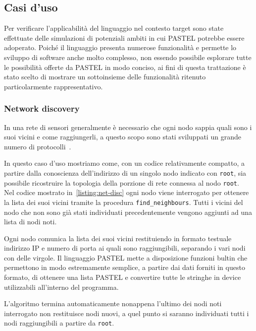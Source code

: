 \documentclass[10pt]{article}
\begin{document}
\subsection{Casi d'uso}\label{subsection:casi-d_uso}
Per verificare l'applicabilità del linguaggio nel contesto target sono state effettuate delle simulazioni di potenziali ambiti in cui PASTEL potrebbe essere adoperato. Poiché il linguaggio presenta numerose funzionalità e permette lo sviluppo di software anche molto complesso, non essendo possibile esplorare tutte le possibilità offerte da PASTEL in modo conciso, ai fini di questa trattazione è stato scelto di mostrare un sottoinsieme delle funzionalità ritenuto particolarmente rappresentativo.

\subsubsection{Network discovery}\label{subsubsection:net-disc}
In una rete di sensori generalmente è necessario che ogni nodo sappia quali sono i suoi vicini e come raggiungerli, a questo scopo sono stati sviluppati un grande numero di protocolli~\cite{narten1998neighbor, kandhalu2010u, alsa2012secure}.

In questo caso d'uso mostriamo come, con un codice relativamente compatto, a partire dalla conoscienza dell'indirizzo di un singolo nodo indicato con \texttt{root}, sia possibile ricostruire la topologia della porzione di rete connessa al nodo \texttt{root}.\\
Nel codice mostrato in~\ref{listing:net-disc} ogni nodo viene interrogato per ottenere la lista dei suoi vicini tramite la procedura \texttt{find\_neighbours}. Tutti i vicini del nodo che non sono già stati individuati precedentemente vengono aggiunti ad una lista di nodi noti.

Ogni nodo comunica la lista dei suoi vicini restituiendo in formato testuale indirizzo IP e numero di porta ai quali sono raggiungibili, separando i vari nodi con delle virgole. Il linguaggio PASTEL mette a disposizione funzioni bultin che permettono in modo estremamente semplice, a partire dai dati forniti in questo formato, di ottenere una lista PASTEL e convertire tutte le stringhe in device utilizzabili all'interno del programma.

L'algoritmo termina automaticamente nonappena l'ultimo dei nodi noti interrogato non restituisce nodi nuovi, a quel punto si saranno individuati tutti i nodi raggiungibili a partire da \texttt{root}.
\end{document}
